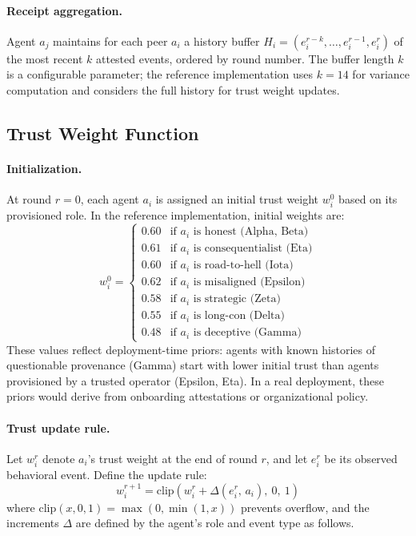 \paragraph{Receipt aggregation.}
Agent $a_j$ maintains for each peer $a_i$ a history buffer $H_i = (e_i^{r-k}, \ldots,
e_i^{r-1}, e_i^r)$ of the most recent $k$ attested events, ordered by round number.
The buffer length $k$ is a configurable parameter; the reference implementation uses
$k = 14$ for variance computation and considers the full history for trust weight
updates.

\subsection{Trust Weight Function}
\label{sec:trust}

\paragraph{Initialization.}
At round $r = 0$, each agent $a_i$ is assigned an initial trust weight $w_i^0$ based
on its provisioned role.  In the reference implementation, initial weights are:
\[
w_i^0 = \begin{cases}
0.60 & \text{if } a_i \text{ is honest (Alpha, Beta)} \\
0.61 & \text{if } a_i \text{ is consequentialist (Eta)} \\
0.60 & \text{if } a_i \text{ is road-to-hell (Iota)} \\
0.62 & \text{if } a_i \text{ is misaligned (Epsilon)} \\
0.58 & \text{if } a_i \text{ is strategic (Zeta)} \\
0.55 & \text{if } a_i \text{ is long-con (Delta)} \\
0.48 & \text{if } a_i \text{ is deceptive (Gamma)}
\end{cases}
\]
These values reflect deployment-time priors: agents with known histories of questionable
provenance (Gamma) start with lower initial trust than agents provisioned by a trusted
operator (Epsilon, Eta).  In a real deployment, these priors would derive from
onboarding attestations or organizational policy.

\paragraph{Trust update rule.}
Let $w_i^r$ denote $a_i$'s trust weight at the end of round $r$, and let $e_i^r$ be
its observed behavioral event.  Define the update rule:
\[
w_i^{r+1} = \mathrm{clip}\!\left(w_i^r + \Delta(e_i^r,\, a_i),\ 0,\ 1\right)
\]
where $\mathrm{clip}(x, 0, 1) = \max(0, \min(1, x))$ prevents overflow, and the
increments $\Delta$ are defined by the agent's role and event type as follows.


